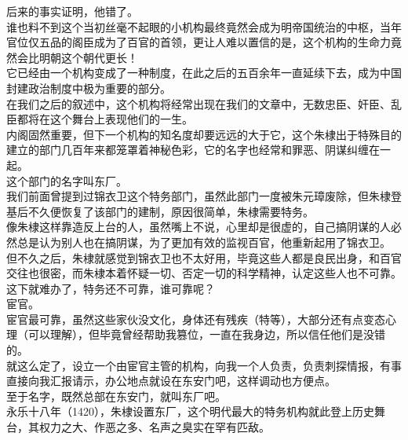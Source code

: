 \begin{multicols}{\theparacolNo}
后来的事实证明，他错了。\\

谁也料不到这个当初丝毫不起眼的小机构最终竟然会成为明帝国统治的中枢，当年官位仅五品的阁臣成为了百官的首领，更让人难以置信的是，这个机构的生命力竟然会比明朝这个朝代更长！\\

它已经由一个机构变成了一种制度，在此之后的五百余年一直延续下去，成为中国封建政治制度中极为重要的部分。\\

在我们之后的叙述中，这个机构将经常出现在我们的文章中，无数忠臣、奸臣、乱臣都将在这个舞台上表现他们的一生。\\

内阁固然重要，但下一个机构的知名度却要远远的大于它，这个朱棣出于特殊目的建立的部门几百年来都笼罩着神秘色彩，它的名字也经常和罪恶、阴谋纠缠在一起。\\

这个部门的名字叫东厂。\\

我们前面曾提到过锦衣卫这个特务部门，虽然此部门一度被朱元璋废除，但朱棣登基后不久便恢复了该部门的建制，原因很简单，朱棣需要特务。\\

像朱棣这样靠造反上台的人，虽然嘴上不说，心里却是很虚的，自己搞阴谋的人必然总是认为别人也在搞阴谋，为了更加有效的监视百官，他重新起用了锦衣卫。\\

但不久之后，朱棣就感觉到锦衣卫也不太好用，毕竟这些人都是良民出身，和百官交往也很密，而朱棣本着怀疑一切、否定一切的科学精神，认定这些人也不可靠。\\

这下就难办了，特务还不可靠，谁可靠呢？\\

宦官。\\

宦官最可靠，虽然这些家伙没文化，身体还有残疾（特等），大部分还有点变态心理（可以理解），但毕竟曾经帮助我篡位，一直在我身边，所以信任他们是没错的。\\

就这么定了，设立一个由宦官主管的机构，向我一个人负责，负责刺探情报，有事直接向我汇报请示，办公地点就设在东安门吧，这样调动也方便点。\\

至于名字，既然总部在东安门，就叫东厂吧。\\

永乐十八年（1420），朱棣设置东厂，这个明代最大的特务机构就此登上历史舞台，其权力之大、作恶之多、名声之臭实在罕有匹敌。\\


\end{multicols}
